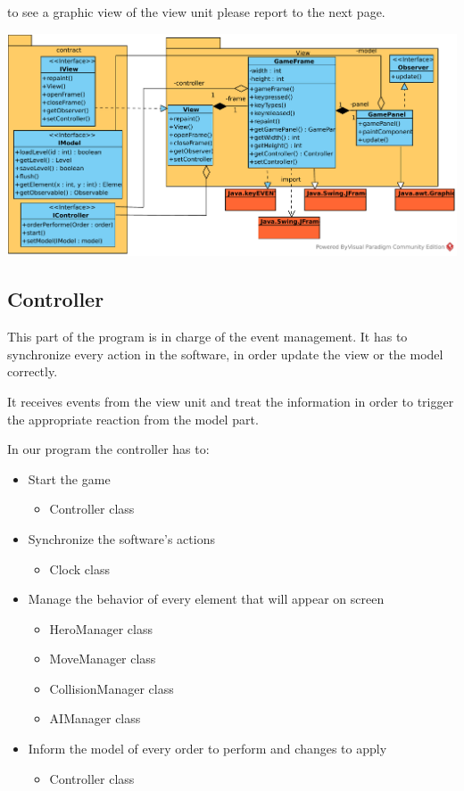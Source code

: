 \documentclass{report}
\begin{document}
to see a graphic view of the view unit please report to the next page.

\begin{landscape}

\vspace*{\fill}

\includegraphics[scale=1.1]{resources/SVG/view.pdf}

\vspace*{\fill}

\end{landscape}

\subsection{Controller}

This part of the program is in charge of the event management. It has to synchronize every action in the software, in order update the view or the model correctly. 

It receives events from the view unit and treat the information in order to trigger the appropriate reaction from the model part.

In our program the controller has to:

\begin{itemize}
\item Start the game
	\begin{itemize}
	\item Controller class
	\end{itemize}
\item Synchronize the software’s actions
	\begin{itemize}
	\item Clock class
	\end{itemize}
\item Manage the behavior of every element that will appear on screen
	\begin{itemize}
	\item HeroManager class
	\item MoveManager class
	\item CollisionManager class
	\item AIManager class
	\end{itemize}
\item Inform the model of every order to perform and changes to apply
	\begin{itemize}
	\item Controller class
	\end{itemize}
\end{itemize}
\end{document}
